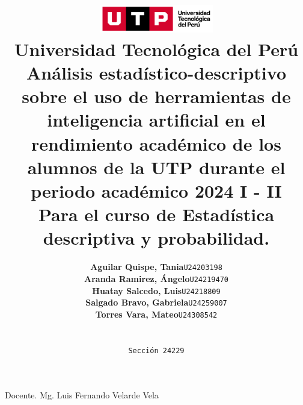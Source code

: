 \documentclass{article}
\title{
  \pagenumbering{gobble}
  \includegraphics[width=5cm]{./assets/logo-utp.png} \\
  \vspace{1cm}
  \textbf{Universidad Tecnológica del Perú} \\
  \vspace{2cm}
  \textbf{Análisis estadístico-descriptivo sobre el uso de herramientas de inteligencia artificial en el rendimiento académico de los alumnos de la UTP durante el periodo académico 2024 I - II} \\
  \vspace{1cm}
  \large \textbf{Para el curso de Estadística descriptiva y probabilidad.}
}
\author{
  \begin{tabular}{ll}
    \textbf{Aguilar Quispe, Tania} & \texttt{U24203198} \\
    \textbf{Aranda Ramirez, Ángelo} & \texttt{U24219470} \\
    \textbf{Huatay Salcedo, Luis} & \texttt{U24218809} \\
    \textbf{Salgado Bravo, Gabriela} & \texttt{U24259007} \\
    \textbf{Torres Vara, Mateo} & \texttt{U24308542} \\
  \end{tabular} \\\\
  \texttt{Sección 24229}
}
\begin{document}
\maketitle
\begin{center}

  Docente. Mg. Luis Fernando Velarde Vela

\end{center}

%
%

\newpage

\setcounter{page}{2}  

\tableofcontents
\thispagestyle{fancy}




















\end{document}
